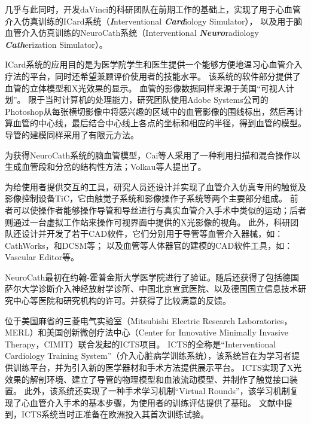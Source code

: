 几乎与此同时，开发daVinci的科研团队在前期工作的基础上，实现了用于心血管介入仿真训练的ICard系统（\textbf{\textit{I}}nterventional \textbf{\textit{Card}}iology Simulator）\cite{Wang1997ICard}\cite{Chui1998ICard}\cite{Wang1998ICard}\cite{Lim1997ICard}，
以及用于脑血管介入仿真训练的NeuroCath系统（Interventional \textbf{\textit{Neuro}}radiology \textbf{\textit{Cath}}erization Simulator）\cite{Ma2000NeuroCath}\cite{Nowinski2000NeuroCath}\cite{Ma2001NeuroCath}\cite{Li2001NeuroCath}\cite{Nowinski2001NeuroCath}\cite{Anderson2001NeuroCath}\cite{Chui2002NeuroCath}\cite{Anderson2002NeuroCath}\cite{Ma2004NeuroCath}\cite{Volkau2005Vessel}\cite{Ma2005NeuroCath}\cite{Ma2006NeuroCath}\cite{Ma2006aNeuroCath}\cite{Ma2007NeuroCath}。

ICard系统的应用目的是为医学院学生和医生提供一个能够方便地温习心血管介入疗法的平台，同时还希望兼顾评价使用者的技能水平。
该系统的软件部分提供了血管的立体模型和X光效果的显示\cite{Wang1998ICard}\cite{Wang1998aICard}。
血管的影像数据同样来源于美国“可视人计划”。
限于当时计算机的处理能力，研究团队使用Adobe Systems公司的Photoshop从每张横切影像中将感兴趣的区域中的血管影像的围线标出，然后再计算血管的中心线，最后结合中心线上各点的坐标和相应的半径，得到血管的模型\cite{Wang1998ICard}。
导管的建模同样采用了有限元方法\cite{Wang1998ICard}。


为获得NeuroCath系统的脑血管模型，Cai等人\cite{Cai2003Vessel}采用了一种利用扫描和混合操作以生成血管段和分岔的结构性方法；Volkau等人\cite{Volkau2008Vessel}\cite{Volkau2005Vessel}提出了。

为给使用者提供交互的工具，研究人员还设计并实现了血管介入仿真专用的触觉及影像控制设备TiC\cite{Chui1999TiC}\cite{Ma1999TiC}，它由触觉子系统和影像操作子系统等两个主要部分组成。
前者可以使操作者能够操作导管和导丝进行与真实血管介入手术中类似的运动；后者则通过一台虚拟工作站来操作可视界面中提供的X光影像的视角。
此外，科研团队还设计并开发了若干CAD软件，它们分别用于导管等血管介入器械，如：CathWorks\cite{Cai1998CathWorks}\cite{Cai2000CathWorks}，和DCSM\cite{Li2001DCSM}等； 以及血管等人体器官的建模的CAD软件工具，如：Vascular Editor\cite{Ma2007NeuroCath}等。

NeuroCath最初在约翰-霍普金斯大学医学院进行了验证。随后还获得了包括德国萨尔大学诊断介入神经放射学诊所、中国北京宣武医院、以及德国国立信息技术研究中心等医院和研究机构的许可。并获得了比较满意的反馈\cite{Ma2007NeuroCath}。

位于美国麻省的三菱电气实验室（Mitsubishi Electric Research Laboratories，MERL）\cite{merlweb}和美国创新微创疗法中心（Center for Innovative Minimally Invasive Therapy，CIMIT）\cite{cimitweb}联合发起的ICTS项目\cite{Dawson2000ICTS}\cite{Cotin2000ICTS}\cite{Shaffer1999ICTS}。
ICTS的全称是“Interventional Cardiology Training System”（介入心脏病学训练系统），该系统旨在为学习者提供训练平台，并为引入新的医学器材和手术方法提供展示平台\cite{Cotin2000ICTS}。
ICTS实现了X光效果的解剖环境、建立了导管的物理模型和血液流动模型、并制作了触觉接口装置\cite{Cotin2000ICTS}。
此外，该系统还实现了一种手术学习机制“Virtual Rounds”\cite{Shaffer1999ICTS}，该学习机制复现了心血管介入手术的基本步骤，为使用者的训练评估提供了基础。
文献\cite{Dawson2000ICTS}中提到，ICTS系统当时正准备在欧洲投入其首次训练试验。

